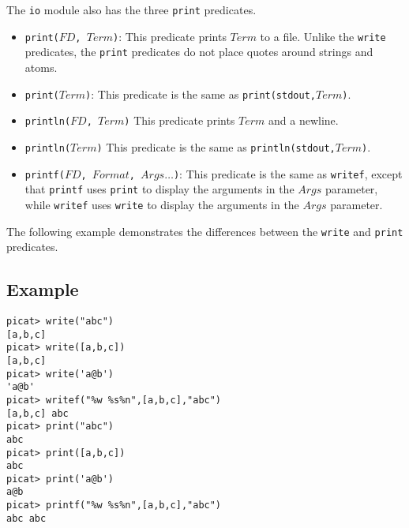 The \texttt{io} module also has the three \texttt{print} predicates.  
\begin{itemize}
\item \texttt{print($FD$, $Term$)}: This predicate prints $Term$ to a file.  Unlike the \texttt{write} predicates, the \texttt{print} predicates do not place quotes around strings and atoms. 
\item \texttt{print($Term$)}: This predicate is the same as \texttt{print(stdout,$Term$)}.
\item \texttt{println($FD$, $Term$)} This predicate prints $Term$ and a newline.
\item \texttt{println($Term$)} This predicate is the same as \texttt{println(stdout,$Term$)}.
\item \texttt{printf($FD$, $Format$, $Args\ldots$)}: This predicate is the same as \texttt{writef}, except that \texttt{printf} uses \texttt{print} to display the arguments in the $Args$ parameter, while \texttt{writef} uses \texttt{write} to display the arguments in the $Args$ parameter.
\end{itemize}

The following example demonstrates the differences between the \texttt{write} and \texttt{print} predicates.  
\subsection*{Example}
\begin{verbatim}
picat> write("abc")
[a,b,c]
picat> write([a,b,c])
[a,b,c]
picat> write('a@b')
'a@b'
picat> writef("%w %s%n",[a,b,c],"abc")
[a,b,c] abc
picat> print("abc")
abc
picat> print([a,b,c])
abc
picat> print('a@b')
a@b
picat> printf("%w %s%n",[a,b,c],"abc")
abc abc
\end{verbatim}

